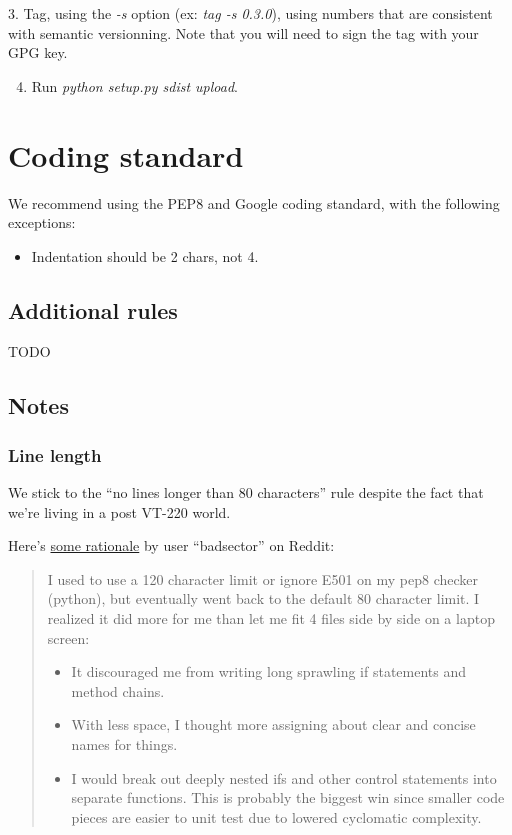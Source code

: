 \documentclass[a4paper,12pt,english]{sphinxmanual}
\begin{document}
3. Tag, using the \emph{-s} option (ex: \emph{tag -s 0.3.0}), using numbers that are
consistent with semantic versionning. Note that you will need to sign the
tag with your GPG key.
\begin{enumerate}
\setcounter{enumi}{3}
\item {} 
Run \emph{python setup.py sdist upload}.

\end{enumerate}


\chapter{Coding standard}
\label{coding-standard:coding-standard}\label{coding-standard::doc}
We recommend using the PEP8 and Google coding standard, with the following exceptions:
\begin{itemize}
\item {} 
Indentation should be 2 chars, not 4.

\end{itemize}


\section{Additional rules}
\label{coding-standard:additional-rules}
TODO


\section{Notes}
\label{coding-standard:notes}

\subsection{Line length}
\label{coding-standard:line-length}
We stick to the ``no lines longer than 80 characters'' rule despite the fact that
we're living in a post VT-220 world.

Here's \href{http://www.reddit.com/r/programming/comments/2nkntp/does\_column\_width\_80\_make\_sense\_in\_2014/cmf3f9s}{some rationale} by user ``badsector'' on Reddit:
\begin{quote}

I used to use a 120 character limit or ignore E501 on my pep8 checker (python), but eventually went back to the default 80 character limit. I realized it did more for me than let me fit 4 files side by side on a laptop screen:
\begin{itemize}
\item {} 
It discouraged me from writing long sprawling if statements and method chains.

\item {} 
With less space, I thought more assigning about clear and concise names for things.

\item {} 
I would break out deeply nested ifs and other control statements into separate functions. This is probably the biggest win since smaller code pieces are easier to unit test due to lowered cyclomatic complexity.

\end{itemize}
\end{quote}
\end{document}
